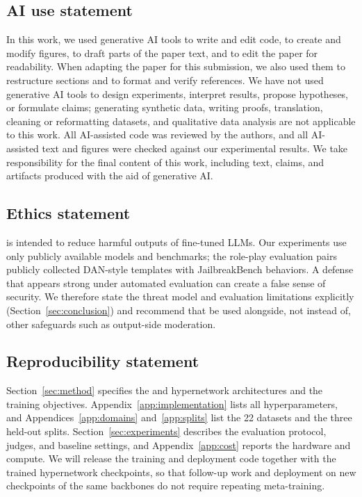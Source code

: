 
\subsection*{AI use statement}
In this work, we used generative AI tools to write and edit code, to create and modify figures, to draft parts of the paper text, and to edit the paper for readability. When adapting the paper for this submission, we also used them to restructure sections and to format and verify references. We have not used generative AI tools to design experiments, interpret results, propose hypotheses, or formulate claims; generating synthetic data, writing proofs, translation, cleaning or reformatting datasets, and qualitative data analysis are not applicable to this work. All AI-assisted code was reviewed by the authors, and all AI-assisted text and figures were checked against our experimental results. We take responsibility for the final content of this work, including text, claims, and artifacts produced with the aid of generative AI.

\subsection*{Ethics statement}
\method{} is intended to reduce harmful outputs of fine-tuned LLMs. Our experiments use only publicly available models and benchmarks; the role-play evaluation pairs publicly collected DAN-style templates with JailbreakBench behaviors. A defense that appears strong under automated evaluation can create a false sense of security. We therefore state the threat model and evaluation limitations explicitly (Section~\ref{sec:conclusion}) and recommend that \method{} be used alongside, not instead of, other safeguards such as output-side moderation.

\subsection*{Reproducibility statement}
Section~\ref{sec:method} specifies the \ssn{} and hypernetwork architectures and the training objectives. Appendix~\ref{app:implementation} lists all hyperparameters, and Appendices~\ref{app:domains} and~\ref{app:splits} list the 22 datasets and the three held-out splits. Section~\ref{sec:experiments} describes the evaluation protocol, judges, and baseline settings, and Appendix~\ref{app:cost} reports the hardware and compute. We will release the training and deployment code together with the trained hypernetwork checkpoints, so that follow-up work and deployment on new checkpoints of the same backbones do not require repeating meta-training.
